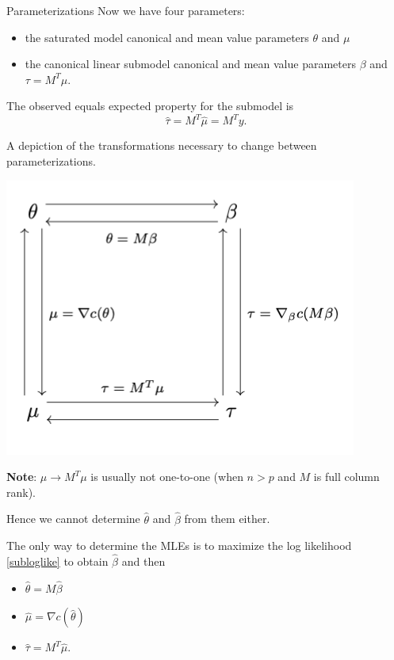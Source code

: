 \documentclass[
  ignorenonframetext,
]{beamer}
\providecommand{\tightlist}{%
  \setlength{\itemsep}{0pt}\setlength{\parskip}{0pt}}
\begin{document}
\begin{frame}{Parameterizations}
\protect\hypertarget{parameterizations}{}
Now we have four parameters:

\begin{itemize}
\tightlist
\item
  the saturated model canonical and mean value parameters \(\theta\) and
  \(\mu\)
\item
  the canonical linear submodel canonical and mean value parameters
  \(\beta\) and \(\tau = M^T\mu\).
\end{itemize}

The observed equals expected property for the submodel is
\begin{equation} \label{submodelmvp}
    \hat\tau = M^T\hat\mu = M^Ty.
\end{equation}
\end{frame}

\begin{frame}{}
\protect\hypertarget{section-2}{}
A depiction of the transformations necessary to change between
parameterizations.

\includegraphics{transformations.png}
\end{frame}

\begin{frame}{}
\protect\hypertarget{section-3}{}
\textbf{Note}: \(\mu \to M^T\mu\) is usually not one-to-one (when
\(n > p\) and \(M\) is full column rank).

Hence we cannot determine \(\hat\theta\) and \(\hat\beta\) from them
either.

The only way to determine the MLEs is to maximize the log likelihood
\eqref{subloglike} to obtain \(\hat\beta\) and then

\begin{itemize}
\tightlist
\item
  \(\hat\theta = M\hat\beta\)
\item
  \(\hat\mu = \nabla c(\hat\theta)\)
\item
  \(\hat\tau = M^T\hat\mu\).
\end{itemize}
\end{frame}
\end{document}
